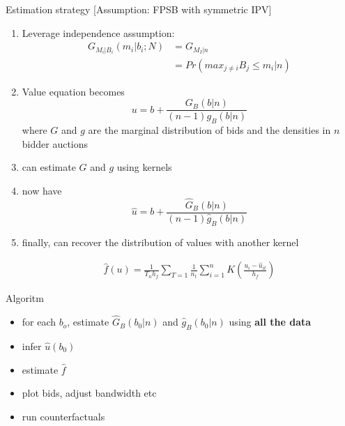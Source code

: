 \begin{frame}[allowframebreaks]{Estimation strategy}
  [Assumption: FPSB with symmetric IPV]

  \begin{enumerate}
    \item Leverage independence assumption: 
    \begin{align*}  
      G_{M_i | B_i}(m_i | b_i; N) &= G_{M_I | n} \\
                                  &= Pr(max_{j\neq i} B_j \leq m_i | n )      
    \end{align*}  
    \item Value equation becomes 
    $$ u = b + \frac{G_B \left(b | n \right)}{ (n-1) g_B \left(b | n \right)} $$
    where $G$ and $g$ are the marginal distribution of bids and the densities in $n$ bidder auctions

    \item can estimate $G$ and $g$ using kernels 

    \framebreak

    \item now have 
    $$ \hat u = b + \frac{\hat G_B \left(b | n \right)}{ (n-1) \hat g_B \left(b | n \right)} $$

    \item finally, can recover the distribution of values with another kernel 
    
    \begin{eqnarray*}
      \hat{f}(u) = \frac{1}{T_nh_f} \sum_{T=1}\frac{1}{n_t}\sum_{i=1}^{n}  K \left( \frac{u_i - \hat u_{it}}{h_f} \right)
    \end{eqnarray*}

  \end{enumerate}

\end{frame}  

\begin{frame}{Algoritm}
\begin{itemize}
   \item for each $b_o$, estimate $\hat G_B(b_0|n)$ and $\hat g_B(b_0|n)$ using \textbf{all the data}
   \item infer $\hat u(b_0)$
   \item estimate $\hat f$ 
   \item plot bids, adjust bandwidth etc 
   \item run counterfactuals 
\end{itemize}
\end{frame}

